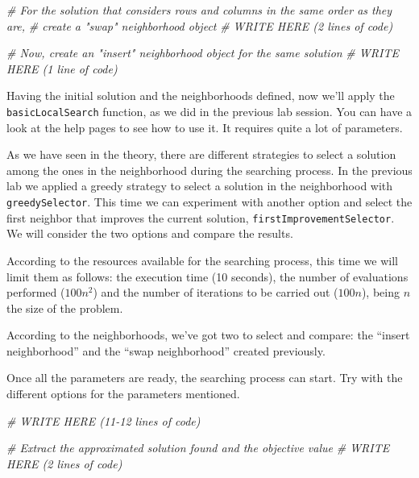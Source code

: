 \documentclass[
]{article}
\newenvironment{Shaded}{\begin{snugshade}}{\end{snugshade}}
\newcommand{\CommentTok}[1]{\textcolor[rgb]{0.56,0.35,0.01}{\textit{#1}}}
\begin{document}
\begin{Shaded}
\begin{Highlighting}[]
\CommentTok{\# For the solution that considers rows and columns in the same order as they are, }
\CommentTok{\# create a "swap" neighborhood object}
\CommentTok{\# WRITE HERE (2 lines of code)}






\CommentTok{\# Now, create an "insert" neighborhood object for the same solution}
\CommentTok{\# WRITE HERE (1 line of code)}
\end{Highlighting}
\end{Shaded}

Having the initial solution and the neighborhoods defined, now we'll
apply the \texttt{basicLocalSearch} function, as we did in the previous
lab session. You can have a look at the help pages to see how to use it.
It requires quite a lot of parameters.

As we have seen in the theory, there are different strategies to select
a solution among the ones in the neighborhood during the searching
process. In the previous lab we applied a greedy strategy to select a
solution in the neighborhood with \texttt{greedySelector}. This time we
can experiment with another option and select the first neighbor that
improves the current solution, \texttt{firstImprovementSelector}. We
will consider the two options and compare the results.

According to the resources available for the searching process, this
time we will limit them as follows: the execution time (10 seconds), the
number of evaluations performed (\(100n^2\)) and the number of
iterations to be carried out (\(100n\)), being \(n\) the size of the
problem.

According to the neighborhoods, we've got two to select and compare: the
``insert neighborhood'' and the ``swap neighborhood'' created
previously.

Once all the parameters are ready, the searching process can start. Try
with the different options for the parameters mentioned.

\begin{Shaded}
\begin{Highlighting}[]
\CommentTok{\# WRITE HERE (11{-}12 lines of code)}








\CommentTok{\# Extract the approximated solution found and the objective value}
\CommentTok{\# WRITE HERE (2 lines of code)}
\end{Highlighting}
\end{Shaded}
\end{document}
